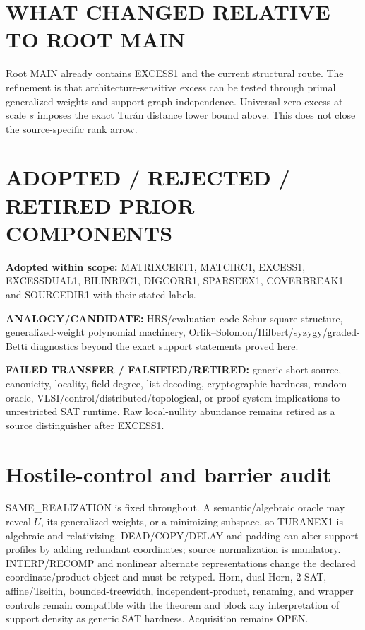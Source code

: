 \documentclass[11pt]{article}
\begin{document}
\section*{WHAT CHANGED RELATIVE TO ROOT MAIN}
Root MAIN already contains EXCESS1 and the current structural route. The refinement is that architecture-sensitive excess can be tested through primal generalized weights and support-graph independence. Universal zero excess at scale $s$ imposes the exact Tur\'an distance lower bound above. This does not close the source-specific rank arrow.

\section*{ADOPTED / REJECTED / RETIRED PRIOR COMPONENTS}
\textbf{Adopted within scope:} MATRIXCERT1, MATCIRC1, EXCESS1, EXCESSDUAL1, BILINREC1, DIGCORR1, SPARSEEX1, COVERBREAK1 and SOURCEDIR1 with their stated labels.

\textbf{ANALOGY/CANDIDATE:} HRS/evaluation-code Schur-square structure, generalized-weight polynomial machinery, Orlik--Solomon/Hilbert/syzygy/graded-Betti diagnostics beyond the exact support statements proved here.

\textbf{FAILED TRANSFER / FALSIFIED/RETIRED:} generic short-source, canonicity, locality, field-degree, list-decoding, cryptographic-hardness, random-oracle, VLSI/control/distributed/topological, or proof-system implications to unrestricted SAT runtime. Raw local-nullity abundance remains retired as a source distinguisher after EXCESS1.

\section*{Hostile-control and barrier audit}
SAME\_REALIZATION is fixed throughout. A semantic/algebraic oracle may reveal $U$, its generalized weights, or a minimizing subspace, so TURANEX1 is algebraic and relativizing. DEAD/COPY/DELAY and padding can alter support profiles by adding redundant coordinates; source normalization is mandatory. INTERP/RECOMP and nonlinear alternate representations change the declared coordinate/product object and must be retyped. Horn, dual-Horn, 2-SAT, affine/Tseitin, bounded-treewidth, independent-product, renaming, and wrapper controls remain compatible with the theorem and block any interpretation of support density as generic SAT hardness. Acquisition remains OPEN.
\end{document}
